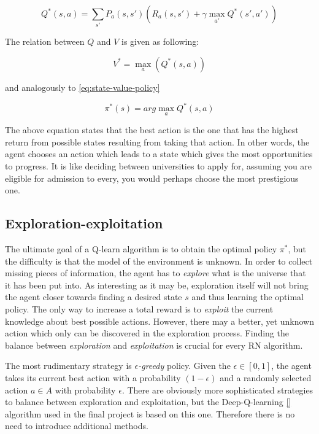 \begin{equation}
    Q^{*}(s, a) = \sum_{s'} P_a(s, s') \left(R_a(s, s') + \gamma \max_{a'} Q^{*}(s', a') \right)
\label{eq:q-value}
\end{equation}

The relation between $Q$ and $V$ is given as following:

\begin{equation}
    V^{*} = \max_a \left(Q^{*} (s, a)\right)
\end{equation}

and analogously to \ref{eq:state-value-policy}

\begin{equation}
    \pi^{*}(s) = arg \max_a Q^{*}(s, a)
\end{equation}

The above equation states that the best action is the one that has the highest return from possible states resulting from taking that action.
In other words, the agent chooses an action which leads to a state which gives the most opportunities to progress. It is like deciding between universities to apply for, assuming you are eligible for admission to every, you would perhaps choose the most prestigious one.

\subsection{Exploration-exploitation}
\label{sub:exploration-exploitation}

The ultimate goal of a Q-learn algorithm is to obtain the optimal policy $\pi^{*}$, but the difficulty is that the model of the environment is unknown. In order to collect missing pieces of information, the agent has to \emph{explore} what is the universe that it has been put into. As interesting as it may be, exploration itself will not bring the agent closer towards finding a desired state $s$ and thus learning the optimal policy. The only way to increase a total reward is to \emph{exploit} the current knowledge about best possible actions. However, there may a better, yet unknown action which only can be discovered in the exploration process. Finding the balance between \emph{exploration} and \emph{exploitation} is crucial for every RN algorithm.

The most rudimentary strategy is \emph{$\epsilon$-greedy} policy. Given the $\epsilon \in [0, 1]$, the agent takes its current best action with a probability $(1 - \epsilon)$ and a randomly selected action $a \in A$ with probability $\epsilon$. There are obviously more sophisticated strategies to balance between exploration and exploitation, but the Deep-Q-learning \ref{} algorithm used in the final project is based on this one. Therefore there is no need to introduce additional methods.

